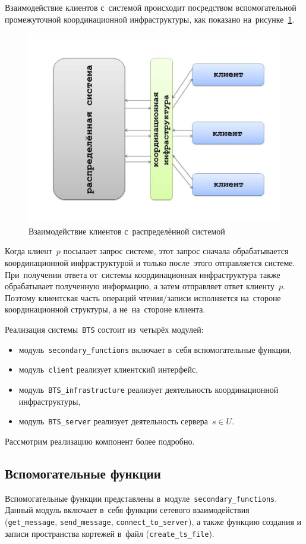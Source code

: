 Взаимодействие клиентов с~системой происходит посредством вспомогательной промежуточной координационной инфраструктуры, как показано на~рисунке~\ref{clser}.
\begin{figure}[H]
	\centering \includegraphics[width=0.7 \textwidth, height=0.5 \textwidth]{img/ClientServer}  \caption{Взаимодействие клиентов с~распределённой системой} \label{clser}
\end{figure}
Когда клиент~$p$ посылает запрос системе, этот запрос сначала обрабатывается координационной инфраструктурой и только после~этого отправляется системе. При~получении ответа от~системы координационная инфраструктура также обрабатывает полученную информацию, а затем отправляет ответ клиенту~$p$. Поэтому клиентская часть операций чтения/записи исполняется на~стороне координационной структуры, а не~на~стороне клиента.

Реализация системы~\texttt{BTS} состоит из~четырёх модулей:
\begin{itemize}
	\item модуль~\texttt{secondary\_functions} включает в~себя вспомогательные функции,
	\item модуль~\texttt{client} реализует клиентский интерфейс,
	\item модуль~\texttt{BTS\_infrastructure} реализует деятельность координационной инфраструктуры,
	\item модуль~\texttt{BTS\_server} реализует деятельность сервера~$s \in U$.
\end{itemize}
Рассмотрим реализацию компонент более подробно.


\subsection{Вспомогательные функции}\label{subsec:2}
Вспомогательные функции представлены в~модуле~\texttt{secondary\_functions}. Данный модуль включает в~себя функции сетевого взаимодействия (\texttt{get_message}, \texttt{send_message}, \texttt{connect_to_server}), а также функцию создания и записи пространства кортежей в~файл (\texttt{create_ts_file}).

